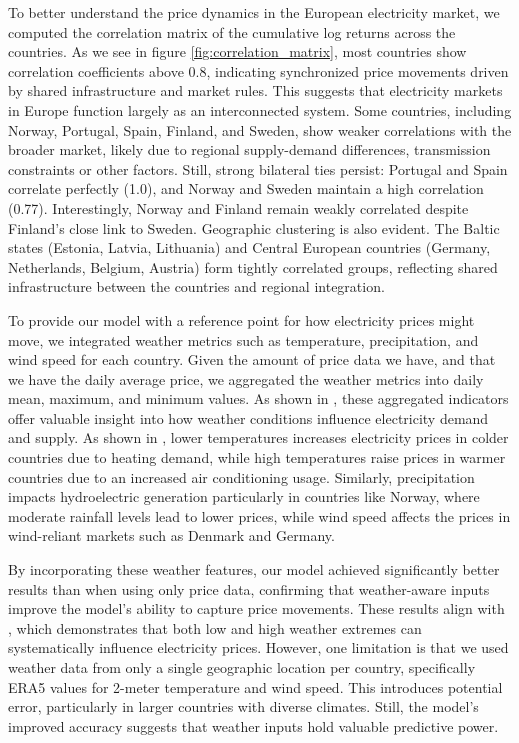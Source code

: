\documentclass[12pt]{article}
\begin{document}
To better understand the price dynamics in the European electricity market, we computed the correlation matrix of the cumulative log returns across the countries. As we see in figure \ref{fig:correlation_matrix}, most countries show correlation coefficients above 0.8, indicating synchronized price movements driven by shared infrastructure and market rules. This suggests that electricity markets in Europe function largely as an interconnected system. Some countries, including Norway, Portugal, Spain, Finland, and Sweden, show weaker correlations with the broader market, likely due to regional supply-demand differences, transmission constraints or other factors. Still, strong bilateral ties persist: Portugal and Spain correlate perfectly (1.0), and Norway and Sweden maintain a high correlation (0.77). Interestingly, Norway and Finland remain weakly correlated despite Finland’s close link to Sweden. Geographic clustering is also evident. The Baltic states (Estonia, Latvia, Lithuania) and Central European countries (Germany, Netherlands, Belgium, Austria) form tightly correlated groups, reflecting shared infrastructure between the countries and regional integration.

\noindent
To provide our model with a reference point for how electricity prices might move, we integrated weather metrics such as temperature, precipitation, and wind speed for each country. Given the amount of price data we have, and that we have the daily average price, we aggregated the weather metrics into daily mean, maximum, and minimum values. As shown in \cite{MOSQUERALOPEZ2024}, these aggregated indicators offer valuable insight into how weather conditions influence electricity demand and supply. As shown in \cite{MOSQUERALOPEZ2024}, lower temperatures increases electricity prices in colder countries due to heating demand, while high temperatures raise prices in warmer countries due to an increased air conditioning usage. Similarly, precipitation impacts hydroelectric generation particularly in countries like Norway, where moderate rainfall levels lead to lower prices, while wind speed affects the prices in wind-reliant markets such as Denmark and Germany.

\noindent
By incorporating these weather features, our model achieved significantly better results than when using only price data, confirming that weather-aware inputs improve the model’s ability to capture price movements. These results align with \cite{MOSQUERALOPEZ2024}, which demonstrates that both low and high weather extremes can systematically influence electricity prices. However, one limitation is that we used weather data from only a single geographic location per country, specifically ERA5 values for 2-meter temperature and wind speed. This introduces potential error, particularly in larger countries with diverse climates. Still, the model’s improved accuracy suggests that weather inputs hold valuable predictive power.
\end{document}
